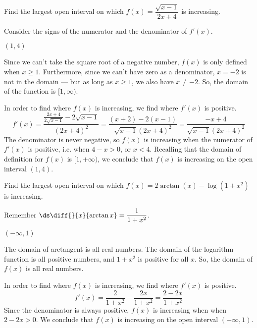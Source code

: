 \begin{question}[2015Q] 
 Find the largest open interval on which $f(x)=\dfrac{\sqrt{x-1}}{2x+4}$ is increasing.
\end{question}
\begin{hint}
Consider the signs of the numerator and the denominator of $f'(x)$.
\end{hint}
\begin{answer}
$(1,4)$
\end{answer}
\begin{solution}
Since we can't take the square root of a negative number,  $f(x)$ is only defined
when $x \ge 1$. Furthermore, since we can't have zero as a denominator, $x=-2$ is  not in the domain --- but as long as $x \ge 1$, we also have $x \ne -2$. So, the domain of the function is $[1,\infty)$.

 In order to find where $f(x)$ is increasing, we find where $f'(x)$ is positive.
$$
f'(x)=\frac{\frac{2x+4}{2\sqrt{x-1}}-2\sqrt{x-1}}{(2x+4)^2}
=\frac{(x+2)-2(x-1)}{\sqrt{x-1}(2x+4)^2}
=\frac{-x+4}{\sqrt{x-1}(2x+4)^2}
$$
The denominator is never negative, so  $f(x)$ is increasing when the numerator of $f'(x)$ is positive, i.e. when $4-x>0$, or $x<4$. Recalling that the domain of definition for $f(x)$ is 
$[1,+\infty)$, we conclude that $f(x)$ is increasing on the open interval $(1,4)$.

\end{solution}


\begin{Mquestion}[2015Q]
Find the largest open interval on which $f(x)=2\arctan (x) - \log(1+x^2)$ is increasing.
\end{Mquestion}
\begin{hint}
Remember $\ds\diff{}{x}\{\arctan x\}=\dfrac{1}{1+x^2}$.
\end{hint}
\begin{answer} $(-\infty,1)$
\end{answer}
\begin{solution}
The domain of arctangent is all real numbers. The domain of the logarithm function is all positive numbers, and $1+x^2$ is positive for all $x$. So, the domain of $f(x)$ is all real numbers.

In order to find where $f(x)$ is increasing, we find where $f'(x)$ is positive.
$$
f'(x)= \frac 2 {1+x^2} - \frac{2x}{1+x^2} = \frac{2-2x}{1+x^2}
$$
Since the denominator is always positive, $f(x)$ is increasing
when when $2-2x>0$. We conclude that $f(x)$ is increasing on the open interval $(-\infty,1)$.
\end{solution}
